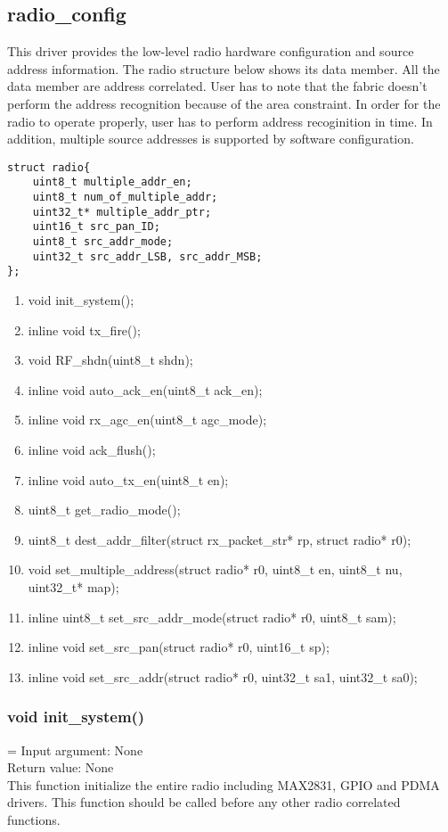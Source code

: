 \clearpage
\subsection{radio\_config}
This driver provides the low-level radio hardware configuration and source address information.
The radio structure below shows its data member. All the data member are address correlated.
User has to note that the fabric doesn't perform the address recognition because of the area
constraint. In order for the radio to operate properly, user has to perform address recoginition
in time. In addition, multiple source addresses is supported by software configuration. 

\begin{lstlisting}[caption=Radio Structure]
struct radio{
	uint8_t multiple_addr_en;
	uint8_t num_of_multiple_addr;
	uint32_t* multiple_addr_ptr;
	uint16_t src_pan_ID;
	uint8_t src_addr_mode;
	uint32_t src_addr_LSB, src_addr_MSB;
};
\end{lstlisting}

\begin{enumerate}
	\item void init\_system();
	\item inline void tx\_fire();
	\item void RF\_shdn(uint8\_t shdn);
	\item inline void auto\_ack\_en(uint8\_t ack\_en);
	\item inline void rx\_agc\_en(uint8\_t agc\_mode);
	\item inline void ack\_flush();
	\item inline void auto\_tx\_en(uint8\_t en);
	\item uint8\_t get\_radio\_mode();
	\item uint8\_t dest\_addr\_filter(struct rx\_packet\_str* rp, struct radio* r0);
	\item void set\_multiple\_address(struct radio* r0, uint8\_t en, uint8\_t nu, uint32\_t* map);
	\item inline uint8\_t set\_src\_addr\_mode(struct radio* r0, uint8\_t sam);
	\item inline void set\_src\_pan(struct radio* r0, uint16\_t sp);
	\item inline void set\_src\_addr(struct radio* r0, uint32\_t sa1, uint32\_t sa0);
\end{enumerate}


\subsubsection{void init\_system()}
\hangindent=\parindent
{}
Input argument: None\\
Return value: None\\
This function initialize the entire radio including MAX2831, GPIO and PDMA drivers. This function
should be called before any other radio correlated functions.

